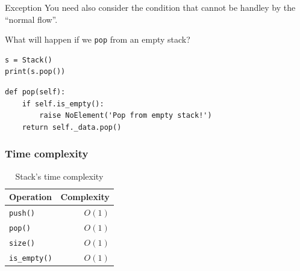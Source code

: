 \documentclass[aspectratio=169, 14pt]{beamer}
\begin{document}
\begin{frame}[fragile]
\begin{block}{Exception}
    You need also consider the condition that cannot be handley by the ``normal flow''.
\end{block}

What will happen if we \texttt{pop} from an empty stack?
\begin{verbatim}
s = Stack()
print(s.pop())   
\end{verbatim}

\pause

\begin{verbatim}
def pop(self):
    if self.is_empty():
        raise NoElement('Pop from empty stack!')
    return self._data.pop()  
\end{verbatim}

\end{frame}

\begin{frame}
    \frametitle{Time complexity}
    \begin{table}
        \caption{Stack's time complexity}
        \begin{tabular}{lr}
          \toprule
          Operation & Complexity\\
          \midrule
          \texttt{push()} & $O(1)$\\
          \texttt{pop()} & $O(1)$ \\
          \texttt{size()} & $O(1)$ \\
          \texttt{is\_empty()} & $O(1)$ \\ 
          \bottomrule
        \end{tabular}
    \end{table}

\end{frame}
\end{document}
